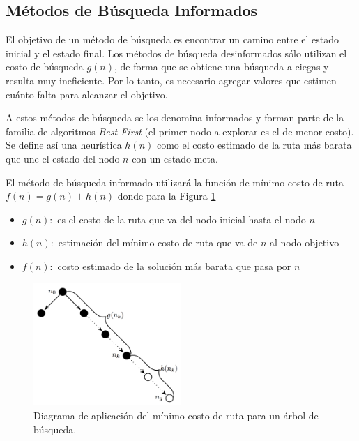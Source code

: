 \documentclass[a4paper,10pt]{article}
\begin{document}
\subsection{Métodos de Búsqueda Informados}

El objetivo de un método de búsqueda es encontrar un camino entre el estado inicial y el estado final. Los métodos de búsqueda desinformados sólo utilizan el costo de búsqueda $g(n)$, de forma que se obtiene una búsqueda a ciegas y resulta muy ineficiente. Por lo tanto, es necesario agregar valores que estimen cuánto falta para alcanzar el objetivo. 

A estos métodos de búsqueda se los denomina informados y forman parte de la familia de algoritmos \textit{Best First} (el primer nodo a explorar es el de menor costo). Se define así una heurística $h(n)$ como el costo estimado de la ruta más barata que une el estado del nodo $n$ con un estado meta. 

El método de búsqueda informado utilizará la función de mínimo costo de ruta $f(n) = g(n) + h(n)$ donde para la Figura \ref{fig:graph}
	\begin{itemize}
		\item $g(n):$ es el costo de la ruta que va del nodo inicial hasta el nodo $n$
		\item $h(n):$ estimación del mínimo costo de ruta que va de $n$ al nodo objetivo
		\item $f(n):$ costo estimado de la solución más barata que pasa por $n$
	\end{itemize}
	
\begin{figure}[H]
	\centering
    \includegraphics[width=0.50\textwidth]{images/graph.png}
    \caption{Diagrama de aplicación del mínimo costo de ruta para un árbol de búsqueda.}
    \label{fig:graph}
\end{figure}
	
\end{document}
